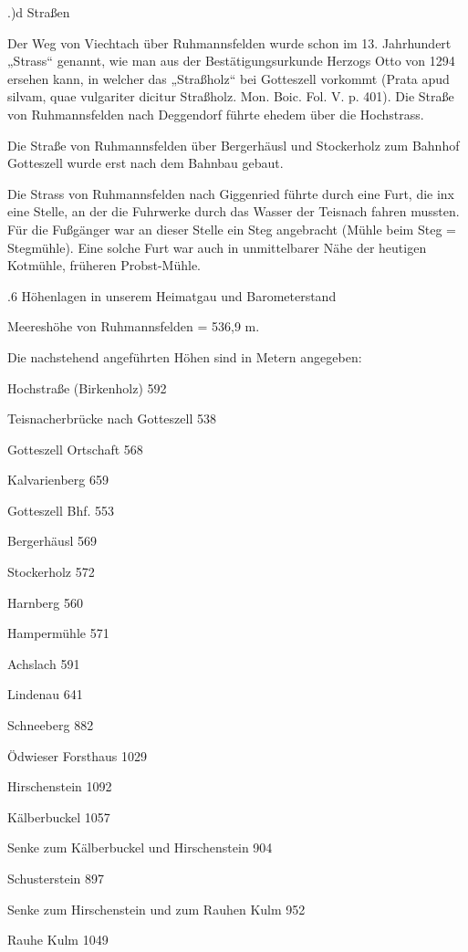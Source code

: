 .)d Straßen

Der Weg von Viechtach über Ruhmannsfelden wurde schon im 13. Jahrhundert
„Strass“ genannt, wie man aus der Bestätigungsurkunde Herzogs Otto von 1294
ersehen kann, in welcher das „Straßholz“ bei Gotteszell vorkommt (Prata apud
silvam, quae vulgariter dicitur Straßholz. Mon. Boic. Fol. V. p. 401). Die
Straße von Ruhmannsfelden nach Deggendorf führte ehedem über die Hochstrass.

Die Straße von Ruhmannsfelden über Bergerhäusl und Stockerholz zum Bahnhof
Gotteszell wurde erst nach dem Bahnbau gebaut.

Die Strass von Ruhmannsfelden nach Giggenried führte durch eine Furt, die inx
eine Stelle, an der die Fuhrwerke durch das Wasser der Teisnach fahren mussten.
Für die Fußgänger war an dieser Stelle ein Steg angebracht (Mühle beim Steg =
Stegmühle). Eine solche Furt war auch in unmittelbarer Nähe der heutigen
Kotmühle, früheren Probst-Mühle.



.6 Höhenlagen in unserem Heimatgau und Barometerstand

Meereshöhe von Ruhmannsfelden = 536,9 m.

Die nachstehend angeführten Höhen sind in Metern angegeben:



Hochstraße (Birkenholz) 592

Teisnacherbrücke nach Gotteszell    538

Gotteszell Ortschaft    568

Kalvarienberg   659

Gotteszell Bhf. 553

Bergerhäusl 569

Stockerholz 572

Harnberg    560

Hampermühle 571

Achslach    591

Lindenau    641

Schneeberg  882

Ödwieser Forsthaus  1029

Hirschenstein   1092

Kälberbuckel    1057

Senke zum Kälberbuckel und Hirschenstein    904

Schusterstein   897

Senke zum Hirschenstein und zum Rauhen Kulm 952

Rauhe Kulm  1049

